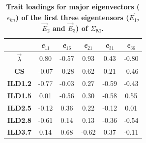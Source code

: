 \begin{table}[!htbp]
\caption[Trait loadings for major eigenvectors ($e_{kn}$) of the first three eigentensors ($\vec{E}_{1}$, $\vec{E}_{2}$ and $\vec{E}_{3}$) of $\Sigma_{\textbf{M}}$.]{\textbf{Trait loadings for major eigenvectors ($e_{kn}$) of the first three eigentensors ($\vec{E}_{1}$, $\vec{E}_{2}$ and $\vec{E}_{3}$) of $\Sigma_{\textbf{M}}$.}}
\label{tab:multi_EigValLoadings}
\begin{center}
\begin{tabular}{>{\bfseries}cS[table-format=2.2]S[table-format=2.2]S[table-format=2.2]S[table-format=2.2]S[table-format=2.2]}
\toprule
& {\textit{e}$_{\textit{11}}$} & {\textit{e}$_{\textit{16}}$} & {\textit{e}$_{\textit{21}}$} & {\textit{e}$_{\textit{31}}$} & {\textit{e}$_{\textit{36}}$} \\
\midrule
$\vec{\lambda}$ & 0.80 & -0.57 & 0.93 & 0.43 & -0.80 \\ 
CS & -0.07 & -0.28 & 0.62 & 0.21 & -0.46 \\ 
ILD1.2 & -0.77 & -0.03 & 0.27 & -0.59 & -0.43 \\ 
ILD1.5 & 0.01 & -0.56 & 0.30 & -0.58 & 0.55 \\ 
ILD2.5 & -0.12 & 0.36 & 0.22 & -0.12 & 0.01 \\ 
ILD2.8 & -0.61 & 0.14 & 0.13 & -0.36 & -0.54 \\ 
ILD3.7 & 0.14 & 0.68 & -0.62 & 0.37 & -0.11 \\
\bottomrule
\end{tabular}
\end{center}
\end{table}

